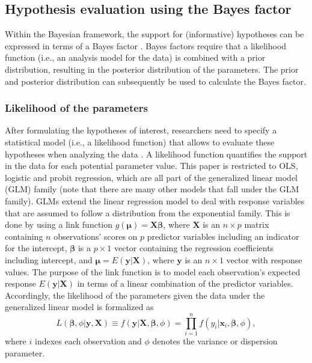 \documentclass[
]{article}
\begin{document}
\hypertarget{hypothesis-evaluation-using-the-bayes-factor}{%
\subsection{Hypothesis evaluation using the Bayes
factor}\label{hypothesis-evaluation-using-the-bayes-factor}}

Within the Bayesian framework, the support for (informative) hypotheses
can be expressed in terms of a Bayes factor
\citep{kass_raftery_bayes_factors_1995}. Bayes factors require that a
likelihood function (i.e., an analysis model for the data) is combined
with a prior distribution, resulting in the posterior distribution of
the parameters. The prior and posterior distribution can subsequently be
used to calculate the Bayes factor.

\hypertarget{likelihood-of-the-parameters}{%
\subsubsection{Likelihood of the
parameters}\label{likelihood-of-the-parameters}}

After formulating the hypotheses of interest, researchers need to
specify a statistical model (i.e., a likelihood function) that allows to
evaluate these hypotheses when analyzing the data
\citep{lynch_introduction_2007}. A likelihood function quantifies the
support in the data for each potential parameter value. This paper is
restricted to OLS, logistic and probit regression, which are all part of
the generalized linear model (GLM) family (note that there are many
other models that fall under the GLM family). GLMs extend the linear
regression model to deal with response variables that are assumed to
follow a distribution from the exponential family. This is done by using
a link function
\(g(\boldsymbol{\mu}) = \boldsymbol{X} \boldsymbol{\beta}\), where
\(\boldsymbol{X}\) is an \(n \times p\) matrix containing \(n\)
observations' scores on \(p\) predictor variables including an indicator
for the intercept, \(\boldsymbol{\beta}\) is a \(p \times 1\) vector
containing the regression coefficients including intercept, and
\(\boldsymbol{\mu} = E(\boldsymbol{y}|\boldsymbol{X})\), where
\(\boldsymbol{y}\) is an \(n \times 1\) vector with response values. The
purpose of the link function is to model each observation's expected
response \(E(\boldsymbol{y}|\boldsymbol{X})\) in terms of a linear
combination of the predictor variables. Accordingly, the likelihood of
the parameters given the data under the generalized linear model is
formalized as \[
L(\boldsymbol{\beta}, \phi| \boldsymbol{y}, \boldsymbol{X}) \equiv 
f(\boldsymbol{y}|\boldsymbol{X}, \boldsymbol{\beta}, \phi) = 
\prod^n_{i=1} f(y_i|\boldsymbol{x}_i, \boldsymbol{\beta}, \phi),
\] where \(i\) indexes each observation and \(\phi\) denotes the
variance or dispersion parameter.
\end{document}
